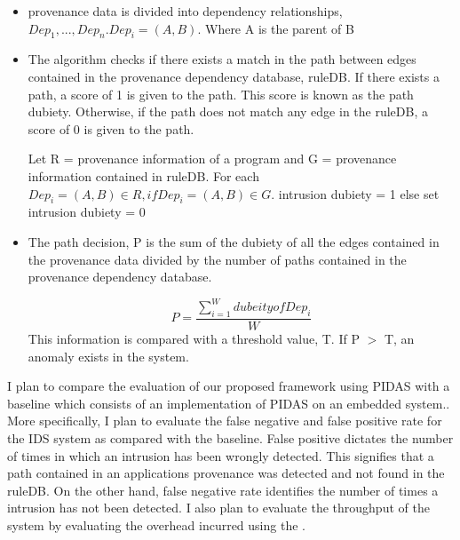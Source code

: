 \begin{itemize}

\item provenance data is divided into dependency relationships, $Dep_1,...,Dep_n. Dep_i =(A, B)$. Where A is the parent of B

\item The algorithm checks if there exists a match in the path between edges contained in the provenance dependency database, ruleDB. If there exists a path, a score of 1 is given to the path. This score is known as the path dubiety. Otherwise, if the path does not match any edge in the ruleDB, a score of 0 is given to the path.

Let R = provenance information of a program and G = provenance information contained in ruleDB. For each $Dep_i = (A, B) \in R, if Dep_i = (A, B) \in G$. intrusion dubiety = 1 else set intrusion dubiety = 0

\item The path decision, P is the sum of the dubiety of all the edges contained in the provenance data divided by the number of paths contained in the provenance dependency database.

 \[P =\frac{\sum\limits_{i=1}^W dubeity of Dep_i }{W} \] This information is compared with a threshold value, T. If P $>$ T, an anomaly exists in the system.

\end{itemize}

I plan to compare the evaluation of our proposed framework using PIDAS with a baseline which consists of an implementation of PIDAS on an embedded system.. More specifically, I plan to evaluate the false negative and false positive rate for the IDS system as compared with the baseline. False positive dictates the number of times in which an intrusion has been wrongly detected. This signifies that a path contained in an applications provenance was detected and not found in the ruleDB. On the other hand, false negative rate identifies the number of times a intrusion has not been detected. I also plan to evaluate the throughput of the system by evaluating the overhead incurred using the .









%
